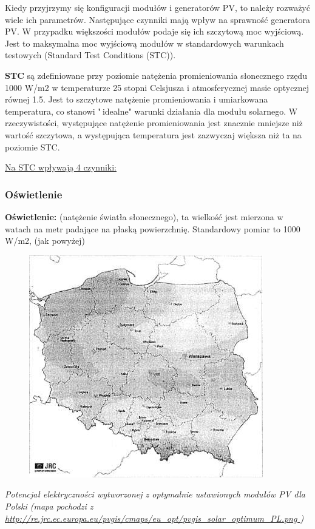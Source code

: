 \documentclass[12pt,a4paper]{article}
\begin{document}
Kiedy przyjrzymy się konfiguracji modułów i generatorów PV, to należy rozważyć wiele ich parametrów. Następujące czynniki mają wpływ na sprawność generatora PV. W przypadku większości modułów podaje się ich szczytową moc wyjściową. Jest to maksymalna moc wyjściową modułów w standardowych warunkach testowych (Standard Test Conditions (STC)). 

\textbf{STC} są zdefiniowane przy poziomie natężenia promieniowania słonecznego rzędu 1000 W/m2 w temperaturze 25 stopni Celsjusza i atmosferycznej masie optycznej równej 1.5. Jest to szczytowe natężenie promieniowania i umiarkowana temperatura, co stanowi "\,idealne" warunki działania dla modułu solarnego. W rzeczywistości, występujące natężenie promieniowania jest znacznie mniejsze niż wartość szczytowa, a występująca temperatura jest zazwyczaj większa niż ta na poziomie STC. 

\underline{Na STC wpływają 4 czynniki:} 
\subsubsection{Oświetlenie}

\textbf{Oświetlenie:} (natężenie światła słonecznego), ta wielkość jest mierzona w watach na metr padające na płaską powierzchnię. Standardowy pomiar to 1000 W/m2, (jak powyżej) 

\begin{figure}[h]
\centering
\includegraphics[natwidth=10.21cm,natheight=9.71cm]{media/image9.jpg}
\end{figure}
 

\textit{Potencjał elektryczności wytworzonej z optymalnie ustawionych 
modułów PV dla Polski (mapa pochodzi z \underline{
http://re.jrc.ec.europa.eu/pvgis/cmaps/eu\_opt/pvgis\_solar\_optimum\_PL.png
}) }
\end{document}
